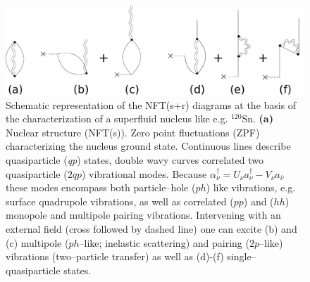 \begin{figure}
\begin{center}
\includegraphics[width=\textwidth]{introduccion/figs/fig1_4_2.pdf}
\caption{Schematic representation of the NFT(s+r) diagrams at the basis of the characterization of a superfluid nucleus like e.g. $^{120}$Sn. \textbf{(a)} Nuclear structure (NFT(s)). Zero point fluctuations (ZPF) characterizing the nucleus ground state. Continuous lines describe quasiparticle (\textit{qp}) states, double wavy curves correlated two quasiparticle ($2qp$) vibrational modes. Because $\alpha^{\dagger}_{\nu}=U_\nu a^\dagger_\nu-V_\nu a_{\bar{\nu}}$ these modes encompass both particle--hole ($ph$) like vibrations, e.g. surface quadrupole vibrations, as well as correlated ($pp$) and ($hh$) monopole and multipole pairing vibrations. Intervening with an external field (cross followed by dashed line) one can excite (b) and (c) multipole ($ph$--like; inelastic scattering) and  pairing ($2p$--like) vibrations (two--particle transfer) as well as (d)-(f) single--quasiparticle states.}\label{fig1.4.2}
\end{center}
\end{figure}


